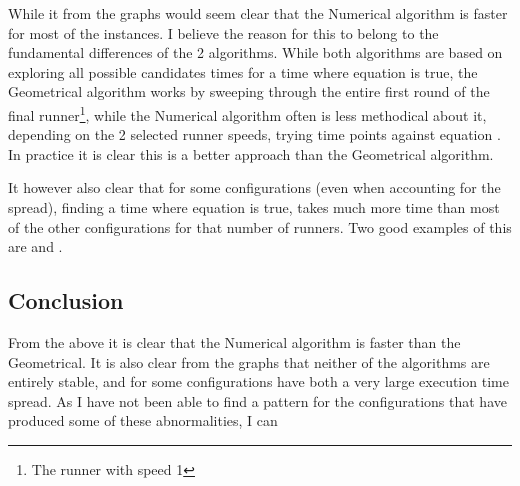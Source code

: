 While it from the graphs would seem clear that the Numerical algorithm is faster for most of the instances. 
I believe the reason for this to belong to the fundamental differences of the 2 algorithms. While both algorithms are based on exploring all possible candidates times for a time where equation  is true, the Geometrical algorithm works by sweeping through the entire first round of the final runner\footnote{The runner with speed 1}, while the Numerical algorithm often is less methodical about it, depending on the 2 selected runner speeds, trying time points against equation . In practice it is clear this is a better approach than the Geometrical algorithm.
 
It however also clear that for some configurations (even when accounting for the spread), finding a time where equation  is true, takes much more time than most of the other configurations for that number of runners. Two good examples of this are  and . 

\subsection{Conclusion}

From the above it is clear that the Numerical algorithm is faster than the Geometrical. It is also clear from the graphs that neither of the algorithms are entirely stable, and for some configurations have both a very large execution time spread. As I have not been able to find a pattern for the configurations that have produced some of these abnormalities, I can 
